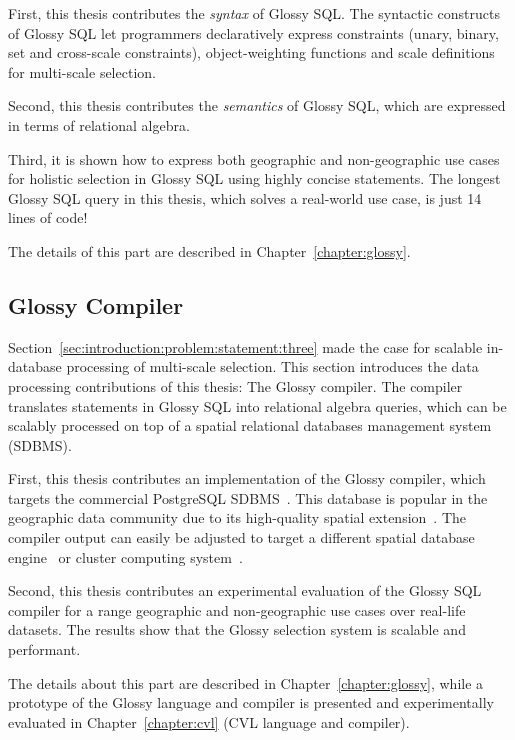 \documentclass[11pt, oneside]{report}
\begin{document}
{First, this thesis contributes the \emph{syntax} of Glossy SQL. The syntactic constructs of Glossy SQL let programmers declaratively express constraints (unary, binary, set and cross-scale constraints), object-weighting functions and scale definitions for multi-scale selection.

Second, this thesis contributes the \emph{semantics} of Glossy SQL, which are expressed in terms of relational algebra.

Third, it is shown how to express both geographic and non-geographic use cases for holistic selection in Glossy SQL using highly concise statements. The longest Glossy SQL query in this thesis, which solves a real-world use case, is just 14 lines of code!

The details of this part are described in Chapter~\ref{chapter:glossy}.

\subsection{Glossy Compiler}
\label{sec:introduction:contributions:glossy}

Section~\ref{sec:introduction:problem:statement:three} made the case for scalable in-database processing of multi-scale selection. This section introduces the data processing contributions of this thesis: The Glossy compiler. The compiler translates statements in Glossy SQL into relational algebra queries, which can be scalably processed on top of a spatial relational databases management system (SDBMS).

First, this thesis contributes an implementation of the Glossy compiler, which targets the commercial PostgreSQL SDBMS~\cite{postgresql,postgis}. This database is popular in the geographic data community due to its high-quality spatial extension~\cite{postgis}. The compiler output can easily be adjusted to target a different spatial database engine~\cite{soliman2014orca} or cluster computing system~\cite{eldawy2014pigeon, thusoo2010hive}.

Second, this thesis contributes an experimental evaluation of the Glossy SQL compiler for a range geographic and non-geographic use cases over real-life datasets. The results show that the Glossy selection system is scalable and performant.

The details about this part are described in Chapter~\ref{chapter:glossy}, while a prototype of the Glossy language and compiler is presented and experimentally evaluated in Chapter~\ref{chapter:cvl} (CVL language and compiler).


}
\end{document}
